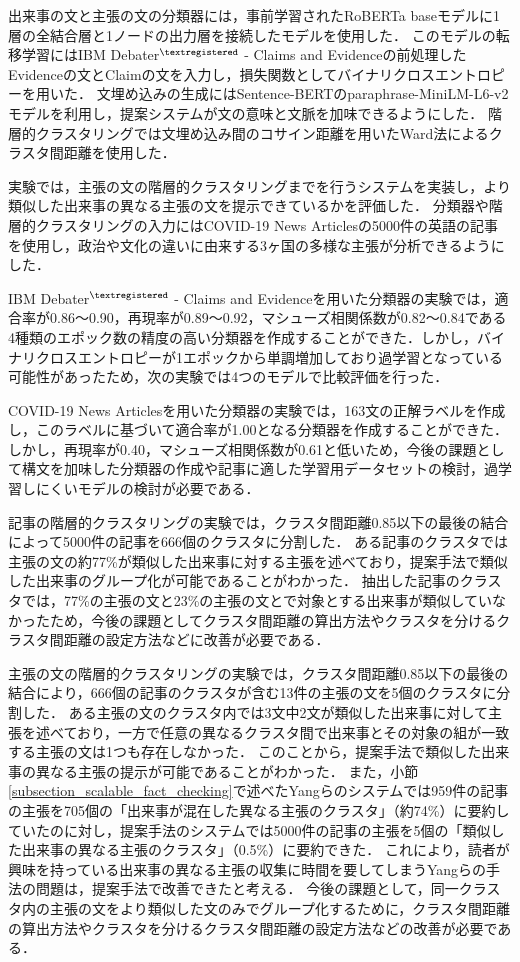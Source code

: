 \documentclass[12pt,a4j]{jreport}
\begin{document}
出来事の文と主張の文の分類器には，事前学習されたRoBERTa baseモデルに1層の全結合層と1ノードの出力層を接続したモデルを使用した．
このモデルの転移学習にはIBM Debater$^{\textregistered}$ - Claims and Evidenceの前処理したEvidenceの文とClaimの文を入力し，損失関数としてバイナリクロスエントロピーを用いた．
文埋め込みの生成にはSentence-BERTのparaphrase-MiniLM-L6-v2モデルを利用し，提案システムが文の意味と文脈を加味できるようにした．
階層的クラスタリングでは文埋め込み間のコサイン距離を用いたWard法によるクラスタ間距離を使用した．

実験では，主張の文の階層的クラスタリングまでを行うシステムを実装し，より類似した出来事の異なる主張の文を提示できているかを評価した．
分類器や階層的クラスタリングの入力にはCOVID-19 News Articlesの5000件の英語の記事を使用し，政治や文化の違いに由来する3ヶ国の多様な主張が分析できるようにした．

IBM Debater$^{\textregistered}$ - Claims and Evidenceを用いた分類器の実験では，適合率が0.86～0.90，再現率が0.89～0.92，マシューズ相関係数が0.82～0.84である4種類のエポック数の精度の高い分類器を作成することができた．しかし，バイナリクロスエントロピーが1エポックから単調増加しており過学習となっている可能性があったため，次の実験では4つのモデルで比較評価を行った．

COVID-19 News Articlesを用いた分類器の実験では，163文の正解ラベルを作成し，このラベルに基づいて適合率が1.00となる分類器を作成することができた．
しかし，再現率が0.40，マシューズ相関係数が0.61と低いため，今後の課題として構文を加味した分類器の作成や記事に適した学習用データセットの検討，過学習しにくいモデルの検討が必要である．

記事の階層的クラスタリングの実験では，クラスタ間距離0.85以下の最後の結合によって5000件の記事を666個のクラスタに分割した．
ある記事のクラスタでは主張の文の約77\%が類似した出来事に対する主張を述べており，提案手法で類似した出来事のグループ化が可能であることがわかった．
抽出した記事のクラスタでは，77\%の主張の文と23\%の主張の文とで対象とする出来事が類似していなかったため，今後の課題としてクラスタ間距離の算出方法やクラスタを分けるクラスタ間距離の設定方法などに改善が必要である．

主張の文の階層的クラスタリングの実験では，クラスタ間距離0.85以下の最後の結合により，666個の記事のクラスタが含む13件の主張の文を5個のクラスタに分割した．
ある主張の文のクラスタ内では3文中2文が類似した出来事に対して主張を述べており，一方で任意の異なるクラスタ間で出来事とその対象の組が一致する主張の文は1つも存在しなかった．
このことから，提案手法で類似した出来事の異なる主張の提示が可能であることがわかった．
また，小節\ref{subsection_scalable_fact_checking}で述べたYangらのシステムでは959件の記事の主張を705個の「出来事が混在した異なる主張のクラスタ」（約74\%）に要約していたのに対し，提案手法のシステムでは5000件の記事の主張を5個の「類似した出来事の異なる主張のクラスタ」（0.5\%）に要約できた．
これにより，読者が興味を持っている出来事の異なる主張の収集に時間を要してしまうYangらの手法の問題は，提案手法で改善できたと考える．
今後の課題として，同一クラスタ内の主張の文をより類似した文のみでグループ化するために，クラスタ間距離の算出方法やクラスタを分けるクラスタ間距離の設定方法などの改善が必要である．
\end{document}
